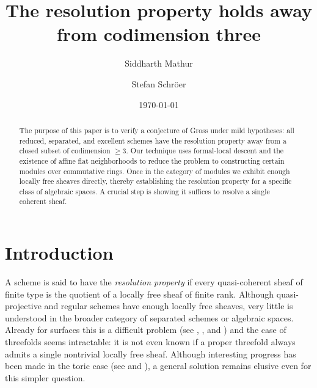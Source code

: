 \documentclass[12pt]{amsart}
\begin{document}
\title
[The resolution property holds away from codimension three] 
{The resolution property holds away from codimension three}
\date{\today}
\author{Siddharth Mathur}
\address{Mathematisches Institut\\Heinrich-Heine-Universit\"at\\40204 D\"usseldorf, Germany.\\}

\author{Stefan Schr\"oer}
\address{Mathematisches Institut\\Heinrich-Heine-Universit\"at\\40204 D\"usseldorf, Germany.\\}

\begin{abstract}

\noindent The purpose of this paper is to verify a conjecture of Gross under mild hypotheses: all reduced, separated, and excellent schemes have the resolution property away from a closed subset of codimension $\geq 3$. Our technique uses formal-local descent and the existence of affine flat neighborhoods to reduce the problem to constructing certain modules over commutative rings. Once in the category of modules we exhibit enough locally free sheaves directly, thereby establishing the resolution property for a specific class of algebraic spaces. A crucial step is showing it suffices to resolve a single coherent sheaf.

\end{abstract}
\maketitle



\tableofcontents


\section{Introduction}
\label{sec:intro}

A scheme is said to have the \emph{resolution property} if every quasi-coherent sheaf of finite type is the quotient of a locally free sheaf of finite rank. Although quasi-projective and regular schemes have enough locally free sheaves, very little is understood in the broader category of separated schemes or algebraic spaces. Already for surfaces this is a difficult problem (see \cite{NormalSurfaceRes}, \cite{SurfaceRes}, and \cite{SidRes}) and the case of threefolds seems intractable: it is not even known if a proper threefold always admits a single nontrivial locally free sheaf. Although interesting progress has been made in the toric case (see \cite{MR2448277} and \cite{PerlingToric}), a general solution remains elusive even for this simpler question. 
\end{document}
